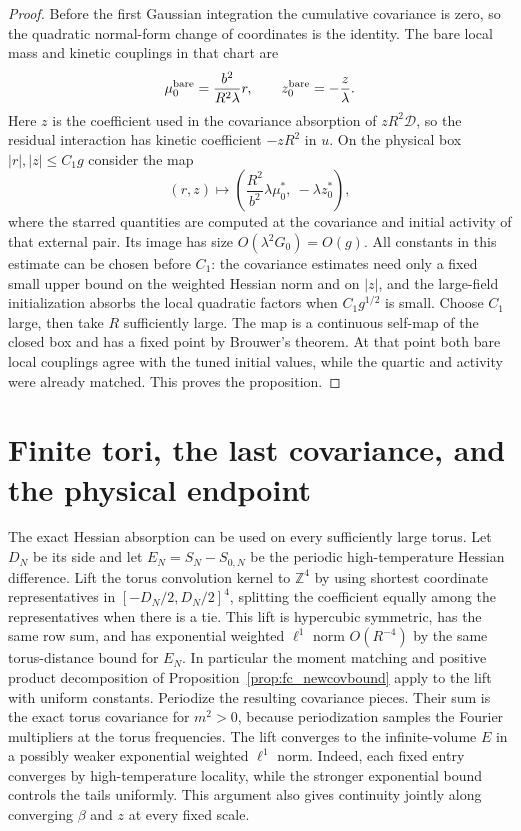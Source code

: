 \documentclass[11pt]{article}
\begin{document}
\begin{proof}
Before the first Gaussian integration the cumulative covariance
is zero, so the quadratic normal-form change of coordinates
is the identity. The bare local mass and kinetic couplings
in that chart are
\[
 \mu_0^{\rm bare}=\frac{b^2}{R^2\lambda}r,
 \qquad
 z_0^{\rm bare}=-\frac{z}{\lambda}.
\]
Here \(z\) is the coefficient used in the covariance absorption
of \(zR^2\mathcal D\), so the residual interaction has
kinetic coefficient \(-zR^2\) in \(u\).
On the physical box \(|r|,|z|\le C_1g\) consider the map
\[
 (r,z)\longmapsto
 \left(\frac{R^2}{b^2}\lambda\mu_0^*,\ -\lambda z_0^*\right),
\]
where the starred quantities are computed at the covariance and
initial activity of that external pair. Its image has size
\(O(\lambda^2G_0)=O(g)\). All constants in this estimate
can be chosen before \(C_1\): the covariance estimates need only
a fixed small upper bound on the weighted Hessian norm and on
\(|z|\), and the large-field initialization absorbs the local
quadratic factors when \(C_1g^{1/2}\) is small. Choose \(C_1\)
large, then take \(R\) sufficiently large. The map is a continuous
self-map of the closed box and has a fixed point by Brouwer's
theorem. At that point both bare local couplings agree with
the tuned initial values, while the quartic and activity
were already matched. This proves the proposition.
\end{proof}


\section{Finite tori, the last covariance, and the physical endpoint}\label{sec:finitevolume}

The exact Hessian absorption can be used on every sufficiently large
torus. Let \(D_N\) be its side and let \(E_N=S_N-S_{0,N}\) be the
periodic high-temperature Hessian difference. Lift the torus convolution
kernel to \(\mathbb Z^4\) by using shortest coordinate representatives
in \([-D_N/2,D_N/2]^4\), splitting the coefficient equally among the
representatives when there is a tie. This lift is hypercubic symmetric,
has the same row sum, and has exponential weighted \(\ell^1\) norm
\(O(R^{-4})\) by the same torus-distance bound for \(E_N\). In
particular the moment matching and positive product decomposition
of Proposition~\ref{prop:fc_newcovbound} apply to the lift with
uniform constants. Periodize the resulting covariance pieces.
Their sum is the exact torus covariance for \(m^2>0\), because
periodization samples the Fourier multipliers at the torus
frequencies. The lift converges to the infinite-volume \(E\) in
a possibly weaker exponential weighted \(\ell^1\) norm. Indeed,
each fixed entry converges by high-temperature locality, while
the stronger exponential bound controls the tails uniformly.
This argument also gives continuity jointly along converging
\(\beta\) and \(z\) at every fixed scale.
\end{document}
